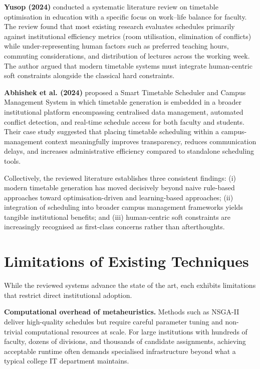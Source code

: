 \textbf{Yusop (2024)} conducted a systematic literature review on timetable optimisation in education with a specific focus on work--life balance for faculty. The review found that most existing research evaluates schedules primarily against institutional efficiency metrics (room utilisation, elimination of conflicts) while under-representing human factors such as preferred teaching hours, commuting considerations, and distribution of lectures across the working week. The author argued that modern timetable systems must integrate human-centric soft constraints alongside the classical hard constraints.

\textbf{Abhishek et al. (2024)} proposed a Smart Timetable Scheduler and Campus Management System in which timetable generation is embedded in a broader institutional platform encompassing centralised data management, automated conflict detection, and real-time schedule access for both faculty and students. Their case study suggested that placing timetable scheduling within a campus-management context meaningfully improves transparency, reduces communication delays, and increases administrative efficiency compared to standalone scheduling tools.

Collectively, the reviewed literature establishes three consistent findings: (i) modern timetable generation has moved decisively beyond naive rule-based approaches toward optimisation-driven and learning-based approaches; (ii) integration of scheduling into broader campus management frameworks yields tangible institutional benefits; and (iii) human-centric soft constraints are increasingly recognised as first-class concerns rather than afterthoughts.

\section{Limitations of Existing Techniques}

While the reviewed systems advance the state of the art, each exhibits limitations that restrict direct institutional adoption.

\textbf{Computational overhead of metaheuristics.} Methods such as NSGA-II deliver high-quality schedules but require careful parameter tuning and non-trivial computational resources at scale. For large institutions with hundreds of faculty, dozens of divisions, and thousands of candidate assignments, achieving acceptable runtime often demands specialised infrastructure beyond what a typical college IT department maintains.

